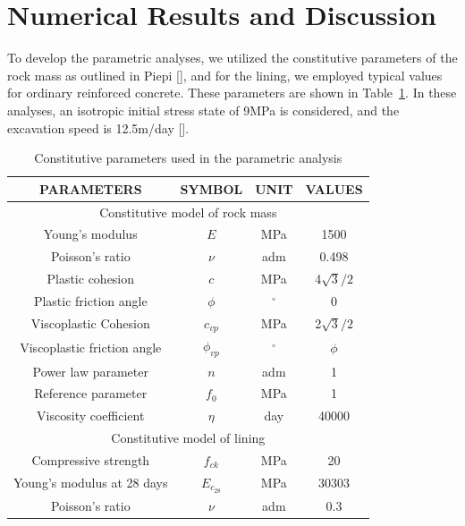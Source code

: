 \documentclass[a4paper,fleqn]{cas-sc}
\begin{document}
\section{Numerical Results and Discussion}\label{}

To develop the parametric analyses, we utilized the constitutive parameters of the rock mass as outlined in Piepi [], and for the lining, we employed typical values for ordinary reinforced concrete. These parameters are shown in Table~\ref{table2}. In these analyses, an isotropic initial stress state of 9MPa is considered, and the excavation speed is 12.5m/day [].
\begin{table}
	\caption{Constitutive parameters used in the parametric analysis}
	\label{table2}
	\centering
	\renewcommand{\arraystretch}{1.25}
	\begin{tabular}{c c c c}
		\hline
		\multicolumn{1}{c}{PARAMETERS} &
		\multicolumn{1}{c}{SYMBOL} &
		\multicolumn{1}{c}{UNIT} &
		\multicolumn{1}{c}{VALUES} \\
		\hline
		\multicolumn{4}{c}{Constitutive model of rock mass} \\
		\hline
		Young's modulus & $E$ & MPa & 1500 \\
		Poisson's ratio & $\nu$ & adm & 0.498 \\
		Plastic cohesion & $c$ & MPa & 4$\sqrt{3}/2$ \\
		Plastic friction angle & $\phi$ & $^{\circ}$ & 0 \\
		Viscoplastic Cohesion & $c_{vp}$ & MPa & 2$\sqrt{3}/2$ \\
		Viscoplastic friction angle & $\phi_{vp}$ & $^{\circ}$ & $\phi$ \\
		Power law parameter & $n$ & adm & 1 \\
		Reference parameter & $f_0$ & MPa & 1 \\
		Viscosity coefficient & $\eta$ & day & 40000 \\
		\hline
		\multicolumn{4}{c}{Constitutive model of lining} \\
		\hline
		
		Compressive strength & $f_{ck}$ & MPa & 20 \\
		Young's modulus at 28 days & $E_{c_{28}}$ & MPa & $30303$ \\
		Poisson's ratio & $\nu$ & adm & 0.3 \\
		

\end{tabular}
\end{table}
\end{document}
